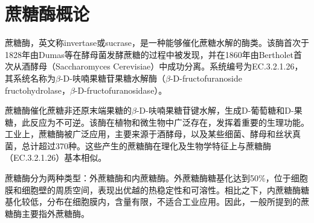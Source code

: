 \cleardoublepage

\section{蔗糖酶概论}

蔗糖酶，英文称invertase或sucrase，是一种能够催化蔗糖水解的酶类。该酶首次于1828年由Dumas等在酵母菌发酵蔗糖的过程中被发现，并在1860年由Bertholet首次从酒酵母（Saccharomyces Cerevisiae）中成功分离。系统编号为EC.3.2.1.26，其系统名称为$\beta$-D-呋喃果糖苷果糖水解酶（$\beta$-D-fructofuranoside fructohydrolase，$\beta$-D-fructofuranosidase）。

蔗糖酶催化蔗糖非还原末端果糖的$\beta$-D-呋喃果糖苷键水解，生成D-葡萄糖和D-果糖，此反应为不可逆。该酶在植物和微生物中广泛存在，发挥着重要的生理功能。工业上，蔗糖酶被广泛应用，主要来源于酒酵母，以及某些细菌、酵母和丝状真菌，总计超过370种。这些产生的蔗糖酶在理化及生物学特征上与蔗糖酶（EC.3.2.1.26）基本相似。

蔗糖酶分为两种类型：外蔗糖酶和内蔗糖酶。外蔗糖酶糖基化达到50\%，位于细胞膜和细胞壁的周质空间，表现出优越的热稳定性和可溶性。相比之下，内蔗糖酶糖基化较低，分布在细胞膜内，含量有限，不适合工业应用。因此，一般所提到的蔗糖酶主要指外蔗糖酶。\cite{kulshrestha2013invertase}


